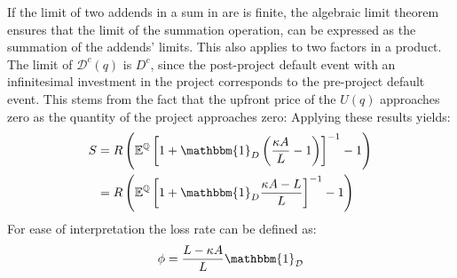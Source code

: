 \documentclass[../main.tex]{subfiles}
\begin{document}
        If the limit of two addends in a sum in are is finite, 
        the algebraic limit theorem ensures that the limit of the summation operation,
        can be expressed as the summation of the addends' limits.
        This also applies to two factors in a product.
        The limit of $\mathcal{D}^{c}(q)$ is $D^{c}$,
        since the post-project default event with an infinitesimal investment in the project
        corresponds to the pre-project default event.
        This stems from the fact that the upfront price of the $U(q)$
        approaches zero as the quantity of the project approaches zero:
        Applying these results yields:
            \begin{align}
                    S
                &=
                    \grossrfrate
                    \left(
                        \mathbb{E}^{\rnmeasure}\left[
                            1
                            +
                            \mathbbm{1}_{D}
                            \left(
                                \frac{
                                    \kappa 
                                    A
                                }{
                                    L 
                                }
                                -
                                1
                            \right) 
                        \right]^{-1}
                        - 
                        1
                    \right)
                \nonumber \\
                &=
                    \grossrfrate
                    \left(
                        \mathbb{E}^{\rnmeasure}\left[
                            1
                            +
                            \mathbbm{1}_{D}
                                \frac{
                                    \kappa 
                                    A
                                    -
                                    L
                                }{
                                    L 
                                }
                        \right]^{-1}
                        - 
                        1
                    \right)
                \label{eqn:limiting-credit-spread-step-1}
            \end{align}
        For ease of interpretation the loss rate can be defined as:
            \begin{equation}
                \phi = \frac{
                        L - \kappa A
                    }{
                        L
                    } 
                \mathbbm{1}_{\mathcal{D}}
                \label{eqn:creditor-loss-rate}
            \end{equation}
\end{document}
